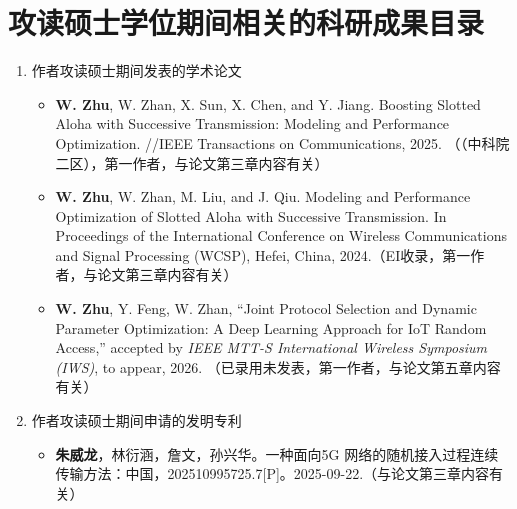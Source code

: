 \chapter{攻读硕士学位期间相关的科研成果目录}

\begin{enumerate}
	\item 作者攻读硕士期间发表的学术论文
	\begin{itemize}
	\item \textbf{ W. Zhu}, W. Zhan, X. Sun, X. Chen, and Y. Jiang. Boosting Slotted Aloha with Successive Transmission: Modeling and Performance Optimization. //IEEE Transactions on Communications, 2025. （（中科院二区），第一作者，与论文第三章内容有关）
	\item \textbf{W. Zhu}, W. Zhan, M. Liu, and J. Qiu. Modeling and Performance Optimization of Slotted Aloha with Successive Transmission. In Proceedings of the International Conference on Wireless Communications and Signal Processing (WCSP), Hefei, China, 2024.（EI收录，第一作者，与论文第三章内容有关）
	\item \textbf{W. Zhu}, Y. Feng, W. Zhan, ``Joint Protocol Selection and Dynamic Parameter Optimization: A Deep Learning Approach for IoT Random Access,'' accepted by \emph{IEEE MTT-S International Wireless Symposium (IWS)}, to appear, 2026. （已录用未发表，第一作者，与论文第五章内容有关）
	\end{itemize}


	\item 作者攻读硕士期间申请的发明专利
	\begin{itemize}
	\item \textbf{朱威龙}，林衍涵，詹文，孙兴华。一种面向5G 网络的随机接入过程连续传输方法：中国，202510995725.7[P]。2025-09-22.（与论文第三章内容有关）
	\end{itemize}



\end{enumerate}
